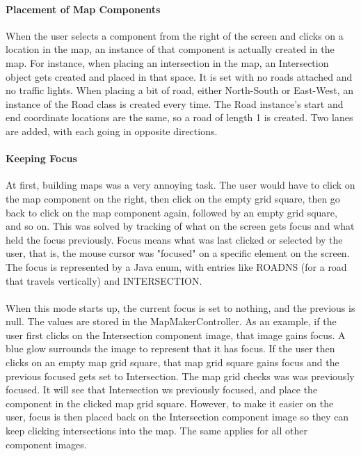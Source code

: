 \documentclass[a4paper,11pt,titlepage]{article}
\begin{document}
\paragraph{Placement of Map Components}
When the user selects a component from the right of the screen and clicks on a location in the map, an instance of that component is actually created in the map. For instance, when placing an intersection in the map, an Intersection object gets created and placed in that space. It is set with no roads attached and no traffic lights. When placing a bit of road, either North-South or East-West, an instance of the Road class is created every time. The Road instance's start and end coordinate locations are the same, so a road of length 1 is created. Two lanes are added, with each going in opposite directions.
\paragraph{Keeping Focus}
At first, building maps was a very annoying task. The user would have to click on the map component on the right, then click on the empty grid square, then go back to click on the map component again, followed by an empty grid square, and so on. This was solved by tracking of what on the screen gets focus and what held the focus previously. Focus means what was last clicked or selected  by the user, that is, the mouse cursor was "focused" on a specific element on the screen. The focus is represented by a Java enum, with entries like ROADNS (for a road that travels vertically) and INTERSECTION. 
\paragraph{}
When this mode starts up, the current focus is set to nothing, and the previous is null. The values are stored in the MapMakerController. As an example, if the user first clicks on the Intersection component image, that image gains focus. A blue glow surrounds the image to represent that it has focus. If the user then clicks on an empty map grid square, that map grid square gains focus and the previous focused gets set to Intersection. The map grid checks was was previously focused. It will see that Intersection ws previously focused, and place the component in the clicked map grid square. However, to make it easier on the user, focus is then placed back on the Intersection component image so they can keep clicking intersections into the map. The same applies for all other component images. 
\end{document}
